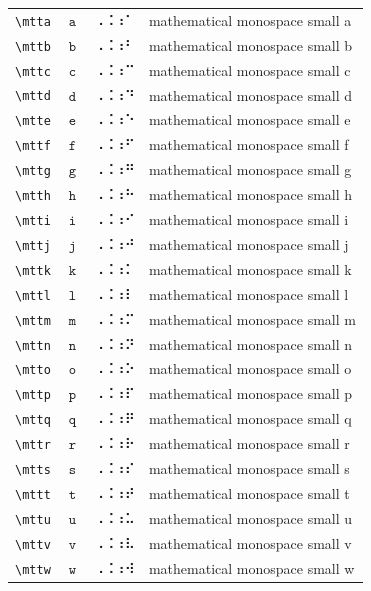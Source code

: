 \documentclass[oneside]{article}
\begin{document}
\begin{longtable}{llll}
\verb|\mtta| & $\mtta$ &  ⠠⠨⠰⠁  & {mathematical monospace small a} \\[2ex]
\verb|\mttb| & $\mttb$ &  ⠠⠨⠰⠃  & {mathematical monospace small b} \\[2ex]
\verb|\mttc| & $\mttc$ &  ⠠⠨⠰⠉  & {mathematical monospace small c} \\[2ex]
\verb|\mttd| & $\mttd$ &  ⠠⠨⠰⠙  & {mathematical monospace small d} \\[2ex]
\verb|\mtte| & $\mtte$ &  ⠠⠨⠰⠑  & {mathematical monospace small e} \\[2ex]
\verb|\mttf| & $\mttf$ &  ⠠⠨⠰⠋  & {mathematical monospace small f} \\[2ex]
\verb|\mttg| & $\mttg$ &  ⠠⠨⠰⠛  & {mathematical monospace small g} \\[2ex]
\verb|\mtth| & $\mtth$ &  ⠠⠨⠰⠓  & {mathematical monospace small h} \\[2ex]
\verb|\mtti| & $\mtti$ &  ⠠⠨⠰⠊  & {mathematical monospace small i} \\[2ex]
\verb|\mttj| & $\mttj$ &  ⠠⠨⠰⠚  & {mathematical monospace small j} \\[2ex]
\verb|\mttk| & $\mttk$ &  ⠠⠨⠰⠅  & {mathematical monospace small k} \\[2ex]
\verb|\mttl| & $\mttl$ &  ⠠⠨⠰⠇  & {mathematical monospace small l} \\[2ex]
\verb|\mttm| & $\mttm$ &  ⠠⠨⠰⠍  & {mathematical monospace small m} \\[2ex]
\verb|\mttn| & $\mttn$ &  ⠠⠨⠰⠝  & {mathematical monospace small n} \\[2ex]
\verb|\mtto| & $\mtto$ &  ⠠⠨⠰⠕  & {mathematical monospace small o} \\[2ex]
\verb|\mttp| & $\mttp$ &  ⠠⠨⠰⠏  & {mathematical monospace small p} \\[2ex]
\verb|\mttq| & $\mttq$ &  ⠠⠨⠰⠟  & {mathematical monospace small q} \\[2ex]
\verb|\mttr| & $\mttr$ &  ⠠⠨⠰⠗  & {mathematical monospace small r} \\[2ex]
\verb|\mtts| & $\mtts$ &  ⠠⠨⠰⠎  & {mathematical monospace small s} \\[2ex]
\verb|\mttt| & $\mttt$ &  ⠠⠨⠰⠞  & {mathematical monospace small t} \\[2ex]
\verb|\mttu| & $\mttu$ &  ⠠⠨⠰⠥  & {mathematical monospace small u} \\[2ex]
\verb|\mttv| & $\mttv$ &  ⠠⠨⠰⠧  & {mathematical monospace small v} \\[2ex]
\verb|\mttw| & $\mttw$ &  ⠠⠨⠰⠺  & {mathematical monospace small w} \\[2ex]

\end{longtable}
\end{document}
